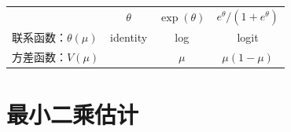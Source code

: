 \documentclass[12pt,a4paper,UTF8,twoside]{book}
\theoremstyle{definition}
\theoremstyle{definition}
\theoremstyle{definition}
\theoremstyle{remark}
\begin{document}
\begin{longtable}[]{@{}lccc@{}}
\begin{minipage}[t]{0.21\columnwidth}
\end{minipage} & \begin{minipage}[t]{0.22\columnwidth}\centering
\(\theta\)\strut
\end{minipage} & \begin{minipage}[t]{0.22\columnwidth}\centering
\(\exp(\theta)\)\strut
\end{minipage} & \begin{minipage}[t]{0.22\columnwidth}\centering
\(e^{\theta}/(1+e^{\theta})\)\strut
\end{minipage}\tabularnewline
\begin{minipage}[t]{0.21\columnwidth}\raggedright
联系函数：\(\theta(\mu)\)\strut
\end{minipage} & \begin{minipage}[t]{0.22\columnwidth}\centering
identity\strut
\end{minipage} & \begin{minipage}[t]{0.22\columnwidth}\centering
log\strut
\end{minipage} & \begin{minipage}[t]{0.22\columnwidth}\centering
logit\strut
\end{minipage}\tabularnewline
\begin{minipage}[t]{0.21\columnwidth}\raggedright
方差函数：\(V(\mu)\)\strut
\end{minipage} & \begin{minipage}[t]{0.22\columnwidth}\centering
1\strut
\end{minipage} & \begin{minipage}[t]{0.22\columnwidth}\centering
\(\mu\)\strut
\end{minipage} & \begin{minipage}[t]{0.22\columnwidth}\centering
\(\mu(1-\mu)\)\strut
\end{minipage}\tabularnewline
\bottomrule
\end{longtable}






\hypertarget{sec:lse}{%
\section{最小二乘估计}\label{sec:lse}}
\end{document}
